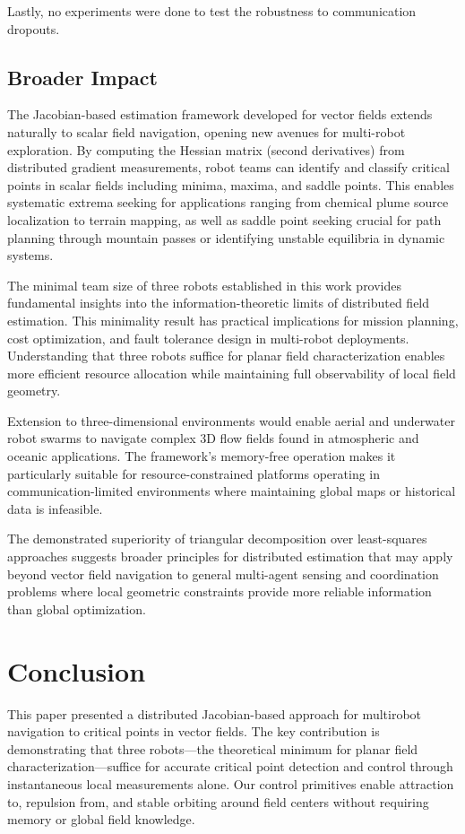\documentclass[lettersize,journal]{IEEEtran}
\begin{document}
Lastly, no experiments were done to test the robustness to communication dropouts.

\subsection{Broader Impact}

The Jacobian-based estimation framework developed for vector fields extends naturally to scalar field navigation, opening new avenues for multi-robot exploration. By computing the Hessian matrix (second derivatives) from distributed gradient measurements, robot teams can identify and classify critical points in scalar fields including minima, maxima, and saddle points. This enables systematic extrema seeking for applications ranging from chemical plume source localization to terrain mapping, as well as saddle point seeking crucial for path planning through mountain passes or identifying unstable equilibria in dynamic systems.

The minimal team size of three robots established in this work provides fundamental insights into the information-theoretic limits of distributed field estimation. This minimality result has practical implications for mission planning, cost optimization, and fault tolerance design in multi-robot deployments. Understanding that three robots suffice for planar field characterization enables more efficient resource allocation while maintaining full observability of local field geometry.

Extension to three-dimensional environments would enable aerial and underwater robot swarms to navigate complex 3D flow fields found in atmospheric and oceanic applications. The framework's memory-free operation makes it particularly suitable for resource-constrained platforms operating in communication-limited environments where maintaining global maps or historical data is infeasible.

The demonstrated superiority of triangular decomposition over least-squares approaches suggests broader principles for distributed estimation that may apply beyond vector field navigation to general multi-agent sensing and coordination problems where local geometric constraints provide more reliable information than global optimization.




\section{Conclusion}
\noindent This paper presented a distributed Jacobian-based approach for multirobot navigation to critical points in vector fields. The key contribution is demonstrating that three robots—the theoretical minimum for planar field characterization—suffice for accurate critical point detection and control through instantaneous local measurements alone. Our control primitives enable attraction to, repulsion from, and stable orbiting around field centers without requiring memory or global field knowledge.
\end{document}
